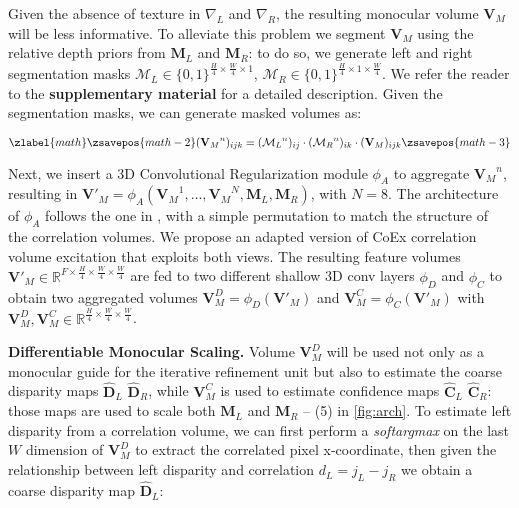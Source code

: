 \documentclass[10pt,twocolumn,letterpaper]{article}
\begin{document}
Given the absence of texture in $\nabla_L$ and $\nabla_R$, the resulting monocular volume $\mathbf{V}_M$ will be less informative.
To alleviate this problem we segment $\mathbf{V}_M$ using the relative depth priors from $\mathbf{M}_L$ and $\mathbf{M}_R$: to do so, we generate left and right segmentation masks $\mathcal{M}_L \in \{0,1\}^{\frac{H}{4} \times \frac{W}{4} \times 1}$, $\mathcal{M}_R \in \{0,1\}^{\frac{H}{4} \times 1 \times \frac{W}{4}}$.
We refer the reader to the \textbf{supplementary material} for a detailed description.
Given the segmentation masks, we can generate masked volumes as:


\begin{equation}
\zlabel{math}
    \zsavepos{math-2}
    ({\mathbf{V}_M}^n)_{ijk} = ({\mathcal{M}_L}^n)_{ij} \cdot ({\mathcal{M}_R}^n)_{ik} \cdot (\mathbf{V}_M)_{ijk}
    \label{eq:vol_masking}
    \zsavepos{math-3}\end{equation}


Next, we insert a 3D Convolutional Regularization module $\phi_A$ to aggregate ${\mathbf{V}_M}^n$, resulting in ${\mathbf{V}'}_M=\phi_A({\mathbf{V}_M}^1,\dots,{\mathbf{V}_M}^{N},\mathbf{M}_L,\mathbf{M}_R)$, with $N=8$. The architecture of $\phi_A$ follows the one in \cite{xu2023iterative}, with a simple permutation to match the structure of the correlation volumes.
We propose an adapted version of CoEx \cite{bangunharcana2021correlate} correlation volume excitation that exploits both views.
The resulting feature volumes ${\mathbf{V}'}_M \in \mathbb{R}^{F \times \frac{H}{4} \times \frac{W}{4} \times \frac{W}{4}}$ are fed to two different shallow 3D conv layers $\phi_D$ and $\phi_C$ to obtain two aggregated volumes $\mathbf{V}^D_M = \phi_D({\mathbf{V}'}_M)$ and $\mathbf{V}^C_M = \phi_C({\mathbf{V}'}_M)$ with $\mathbf{V}^D_M,\mathbf{V}^C_M \in \mathbb{R}^{\frac{H}{4} \times \frac{W}{4} \times \frac{W}{4}}$.

\textbf{Differentiable Monocular Scaling.} Volume $\mathbf{V}^D_M$ will be used not only as a monocular guide for the iterative refinement unit but also to estimate the coarse disparity maps $\hat{\mathbf{D}}_L$ $\hat{\mathbf{D}}_R$, while $\mathbf{V}^C_M$ is used to estimate confidence maps $\hat{\mathbf{C}}_L$ $\hat{\mathbf{C}}_R$: those maps are used to scale both $\mathbf{M}_L$ and $\mathbf{M}_R$ -- (5) in \cref{fig:arch}.
To estimate left disparity from a correlation volume, we can first perform a \textit{softargmax} on the last $W$ dimension of $\mathbf{V}^D_M$ to extract the correlated pixel x-coordinate, then given the relationship between left disparity and correlation $d_L=j_L-j_R$ we obtain a coarse disparity map $\hat{\mathbf{D}}_L$:
\end{document}
